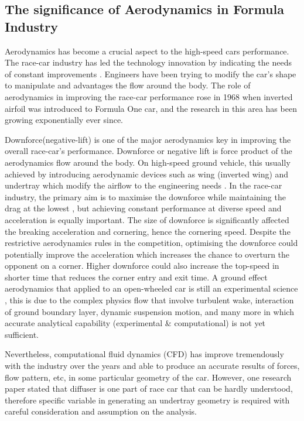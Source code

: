 \subsection{The significance of Aerodynamics in Formula Industry}
Aerodynamics has become a crucial aspect to the high-speed cars performance. The race-car industry has led the technology innovation by indicating the needs of constant improvements \cite{Zhang2006GroundCars}. Engineers have been trying to modify the car's shape to manipulate and advantages the flow around the body. The role of aerodynamics in improving the race-car performance rose in 1968 when inverted airfoil was introduced to Formula One car, and the research in this area has been growing exponentially ever since. 


\noindent Downforce(negative-lift) is one of the major aerodynamics key in improving the overall race-car's performance. Downforce or negative lift is force product of the aerodynamics flow around the body. On high-speed ground vehicle, this usually achieved by introducing aerodynamic devices such as wing (inverted wing) and undertray which modify the airflow to the engineering needs \cite{Wright1982TheCars}. In the race-car industry, the primary aim is to maximise the downforce while maintaining the drag at the lowest \cite{Zhang2006GroundCars}, but achieving constant performance at diverse speed and acceleration is equally important.  The size of downforce is significantly affected the breaking acceleration and cornering, hence the cornering speed. Despite the restrictive aerodynamics rules in the competition, optimising the downforce could potentially improve the acceleration which increases the chance to overturn the opponent on a corner. Higher downforce could also increase the top-speed in shorter time that reduces the corner entry and exit time. A ground effect aerodynamics that applied to an open-wheeled car is still an experimental science \cite{Zhang2006GroundCars}, this is due to the complex physics flow that involve turbulent wake, interaction of ground boundary layer, dynamic suspension motion, and many more in which accurate analytical capability (experimental \& computational) is not yet sufficient.

\noindent Nevertheless, computational fluid dynamics (CFD) has improve tremendously with the industry over the years and able to produce an accurate results of forces, flow pattern, etc, in some particular geometry of the car. However, one research paper \cite{Zhang2006GroundCars} stated that diffuser is one part of race car that can be hardly understood, therefore specific variable in generating an undertray geometry is required with careful consideration and assumption on the analysis. 

